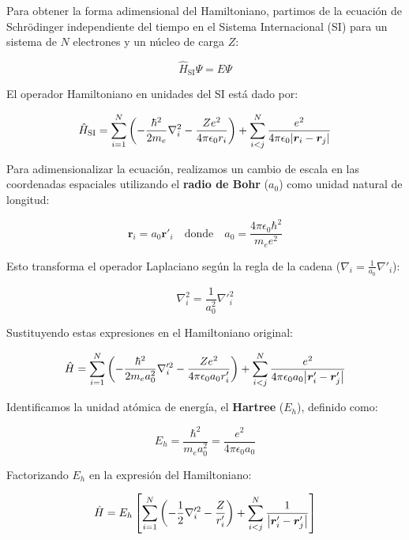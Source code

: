 \documentclass[12pt, a4paper, oneside, spanish]{book}
\begin{document}
Para obtener la forma adimensional del Hamiltoniano, partimos de la ecuación de Schrödinger independiente del tiempo en el Sistema Internacional (SI) para un sistema de $N$ electrones y un núcleo de carga $Z$:

\begin{equation}
    \hat{H}_{\text{SI}} \Psi = E \Psi
\end{equation}

El operador Hamiltoniano en unidades del SI está dado por:

\begin{equation}
    \hat{H}_{\text{SI}} = \sum_{i=1}^N \qty( -\frac{\hbar^2}{2m_e} \nabla_i^2 - \frac{Ze^2}{4\pi\epsilon_0 r_i} ) + \sum_{i<j}^N \frac{e^2}{4\pi\epsilon_0 \abs{\bm{r}_i - \bm{r}_j}}
\end{equation}

Para adimensionalizar la ecuación, realizamos un cambio de escala en las coordenadas espaciales utilizando el \textbf{radio de Bohr} ($a_0$) como unidad natural de longitud:

\begin{equation}
    \bm{r}_i = a_0 \bm{r}'_i \quad \text{donde} \quad a_0 = \frac{4\pi\epsilon_0 \hbar^2}{m_e e^2}
\end{equation}

Esto transforma el operador Laplaciano según la regla de la cadena ($\nabla_i = \frac{1}{a_0}\nabla'_i$):

\begin{equation}
    \nabla_i^2 = \frac{1}{a_0^2} \nabla'^2_i
\end{equation}

Sustituyendo estas expresiones en el Hamiltoniano original:

\begin{equation}
    \hat{H} = \sum_{i=1}^N \qty( -\frac{\hbar^2}{2m_e a_0^2} \nabla'^2_i - \frac{Ze^2}{4\pi\epsilon_0 a_0 r'_i} ) + \sum_{i<j}^N \frac{e^2}{4\pi\epsilon_0 a_0 \abs{\bm{r}'_i - \bm{r}'_j}}
\end{equation}

Identificamos la unidad atómica de energía, el \textbf{Hartree} ($E_h$), definido como:

\begin{equation}
    E_h = \frac{\hbar^2}{m_e a_0^2} = \frac{e^2}{4\pi\epsilon_0 a_0}
\end{equation}

Factorizando $E_h$ en la expresión del Hamiltoniano:

\begin{equation}
    \hat{H} = E_h \left[ \sum_{i=1}^N \qty( -\frac{1}{2} \nabla'^2_i - \frac{Z}{r'_i} ) + \sum_{i<j}^N \frac{1}{\abs{\bm{r}'_i - \bm{r}'_j}} \right]
\end{equation}
\end{document}
